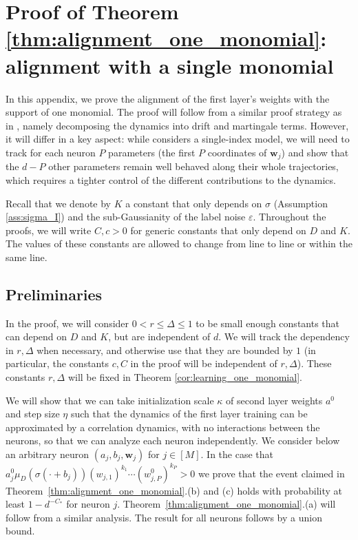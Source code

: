 \documentclass[11pt]{article}
\newcommand{\eps}{\varepsilon}
\newcommand{\<}{\langle}
\renewcommand{\>}{\rangle}
\theoremstyle{definition}
\def\bw{{\boldsymbol w}}
\def\bw{{\boldsymbol w}}
\def\eps{\varepsilon}
\begin{document}
\clearpage









\section{Proof of Theorem \ref{thm:alignment_one_monomial}: alignment with a single monomial}\label{app:proof_alignment_one_monomial}

In this appendix, we prove the alignment of the first layer's weights with the support of one monomial. The proof will follow from a similar proof strategy as in \cite{tan2019online,arous2021online}, namely decomposing the dynamics into drift and martingale terms. However, it will differ in a key aspect: while \cite{arous2021online} considers a single-index model, we will need to track for each neuron $P$ parameters (the first $P$ coordinates of $\bw_j$) and show that the $d-P$ other parameters remain well behaved along their whole trajectories, which requires a tighter control of the different contributions to the dynamics.


Recall that we denote by $K$ a constant that only depends on $\sigma$ (Assumption \ref{ass:sigma_I}) and the sub-Gaussianity of the label noise $\eps$. Throughout the proofs, we will write $C,c>0$ for generic constants that only depend on $D$ and $K$. The values of these constants are allowed to change from line to line or within the same line.

\subsection{Preliminaries}

In the proof, we will consider $0<r\leq \Delta \leq 1$ to be small enough constants that can depend on $D$ and $K$, but are independent of $d$. We will track the dependency in $r,\Delta$ when necessary, and otherwise use that they are bounded by $1$ (in particular, the constants $c,C$ in the proof will be independent of $r,\Delta$). These constants $r,\Delta$ will be fixed in Theorem \ref{cor:learning_one_monomial}.



We will show that we can take initialization scale $\kappa$ of second layer weights $a^0$ and step size $\eta$ such that the dynamics of the first layer training can be approximated by a correlation dynamics, with no interactions between the neurons, so that we can analyze each neuron independently. We consider below an arbitrary neuron $(a_j,b_j,\bw_j)$ for $j \in [M]$. In the case that $a_j^0 \mu_D(\sigma ( \cdot + b_j)) (w_{j,1})^{k_1} \cdots (w_{j,P}^0)^{k_P} > 0$ we 
prove that the event claimed in Theorem~\ref{thm:alignment_one_monomial}.(b) and (c) holds with probability at least $1 - d^{-C_*}$ for neuron $j$. Theorem~\ref{thm:alignment_one_monomial}.(a) will follow from a similar analysis. The result for all neurons follows by a union bound. 
\end{document}
